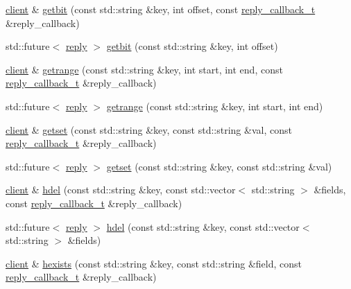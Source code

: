 \begin{DoxyCompactItemize}
\item 
\hyperlink{classcpp__redis_1_1client}{client} \& \hyperlink{classcpp__redis_1_1client_ad57b10f052814a2a15d4687e34d2be72}{getbit} (const std\+::string \&key, int offset, const \hyperlink{classcpp__redis_1_1client_a061a1140d36d2eaeda82b09a0bb3f9f2}{reply\+\_\+callback\+\_\+t} \&reply\+\_\+callback)
\item 
std\+::future$<$ \hyperlink{classcpp__redis_1_1reply}{reply} $>$ \hyperlink{classcpp__redis_1_1client_a43caae473008353b5ddc74a8fb36298c}{getbit} (const std\+::string \&key, int offset)
\item 
\hyperlink{classcpp__redis_1_1client}{client} \& \hyperlink{classcpp__redis_1_1client_a28b3fe6983918c6fc5549f1310742df1}{getrange} (const std\+::string \&key, int start, int end, const \hyperlink{classcpp__redis_1_1client_a061a1140d36d2eaeda82b09a0bb3f9f2}{reply\+\_\+callback\+\_\+t} \&reply\+\_\+callback)
\item 
std\+::future$<$ \hyperlink{classcpp__redis_1_1reply}{reply} $>$ \hyperlink{classcpp__redis_1_1client_a3a0ed59f7fc32ba22c1a9be3c02e5468}{getrange} (const std\+::string \&key, int start, int end)
\item 
\hyperlink{classcpp__redis_1_1client}{client} \& \hyperlink{classcpp__redis_1_1client_a124dca021c3aedd3f8cbb52263e7fec8}{getset} (const std\+::string \&key, const std\+::string \&val, const \hyperlink{classcpp__redis_1_1client_a061a1140d36d2eaeda82b09a0bb3f9f2}{reply\+\_\+callback\+\_\+t} \&reply\+\_\+callback)
\item 
std\+::future$<$ \hyperlink{classcpp__redis_1_1reply}{reply} $>$ \hyperlink{classcpp__redis_1_1client_abcbf060105acb8b1d7b14a5102be19a0}{getset} (const std\+::string \&key, const std\+::string \&val)
\item 
\hyperlink{classcpp__redis_1_1client}{client} \& \hyperlink{classcpp__redis_1_1client_adc62af1a2d07d04fbf274f98f374ab47}{hdel} (const std\+::string \&key, const std\+::vector$<$ std\+::string $>$ \&fields, const \hyperlink{classcpp__redis_1_1client_a061a1140d36d2eaeda82b09a0bb3f9f2}{reply\+\_\+callback\+\_\+t} \&reply\+\_\+callback)
\item 
std\+::future$<$ \hyperlink{classcpp__redis_1_1reply}{reply} $>$ \hyperlink{classcpp__redis_1_1client_a56d4df4d31ffc56e097a8a78cb85d861}{hdel} (const std\+::string \&key, const std\+::vector$<$ std\+::string $>$ \&fields)
\item 
\hyperlink{classcpp__redis_1_1client}{client} \& \hyperlink{classcpp__redis_1_1client_a36aa37c50e8b5e44e17c4f1f0d2c656e}{hexists} (const std\+::string \&key, const std\+::string \&field, const \hyperlink{classcpp__redis_1_1client_a061a1140d36d2eaeda82b09a0bb3f9f2}{reply\+\_\+callback\+\_\+t} \&reply\+\_\+callback)

\end{DoxyCompactItemize}
